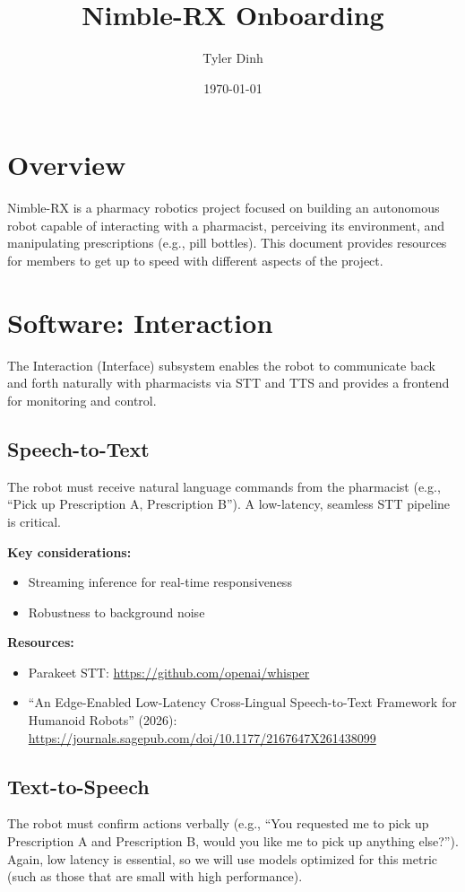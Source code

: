 \documentclass[11pt]{article}
\title{Nimble-RX Onboarding}
\author{Tyler Dinh}
\date{\today}
\begin{document}
\maketitle

\section{Overview}
Nimble-RX is a pharmacy robotics project focused on building an autonomous robot capable of interacting with a pharmacist, perceiving its environment, and manipulating prescriptions (e.g., pill bottles). This document provides resources for members to get up to speed with different aspects of the project.

\section{Software: Interaction}
\label{sec:interface}

The Interaction (Interface) subsystem enables the robot to communicate back and forth naturally with pharmacists via STT and TTS and provides a frontend for monitoring and control.

\subsection{Speech-to-Text}
The robot must receive natural language commands from the pharmacist (e.g., ``Pick up Prescription A, Prescription B''). A low-latency, seamless STT pipeline is critical.

\textbf{Key considerations:}
\begin{itemize}[nosep]
    \item Streaming inference for real-time responsiveness
    \item Robustness to background noise
\end{itemize}

\textbf{Resources:}
\begin{itemize}[nosep]
    \item Parakeet STT: \url{https://github.com/openai/whisper}
    \item ``An Edge-Enabled Low-Latency Cross-Lingual Speech-to-Text Framework for Humanoid Robots'' (2026): \url{https://journals.sagepub.com/doi/10.1177/2167647X261438099}
\end{itemize}

\subsection{Text-to-Speech}
The robot must confirm actions verbally (e.g., ``You requested me to pick up Prescription A and Prescription B, would you like me to pick up anything else?''). Again, low latency is essential, so we will use models optimized for this metric (such as those that are small with high performance).
\end{document}
